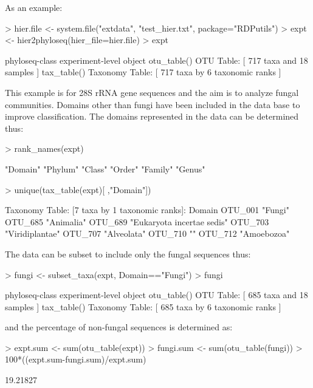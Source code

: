 \documentclass{article}
\begin{document}
As an example:
\begin{Schunk}
\begin{Sinput}
> hier.file <- system.file("extdata", "test_hier.txt", package="RDPutils")
> expt <- hier2phyloseq(hier_file=hier.file)
> expt
\end{Sinput}
\begin{Soutput}
phyloseq-class experiment-level object
otu_table()   OTU Table:         [ 717 taxa and 18 samples ]
tax_table()   Taxonomy Table:    [ 717 taxa by 6 taxonomic ranks ]
\end{Soutput}
\end{Schunk}
This example is for 28S rRNA gene sequences and the aim is to analyze fungal communities.  Domains other than fungi have been included in the data base to improve classification.  The domains represented in the data can be determined thus:
\begin{Schunk}
\begin{Sinput}
> rank_names(expt)
\end{Sinput}
\begin{Soutput}
[1] "Domain" "Phylum" "Class"  "Order"  "Family" "Genus" 
\end{Soutput}
\begin{Sinput}
> unique(tax_table(expt)[ ,"Domain"])
\end{Sinput}
\begin{Soutput}
Taxonomy Table:     [7 taxa by 1 taxonomic ranks]:
        Domain                    
OTU_001 "Fungi"                   
OTU_685 "Animalia"                
OTU_689 "Eukaryota incertae sedis"
OTU_703 "Viridiplantae"           
OTU_707 "Alveolata"               
OTU_710 ""                        
OTU_712 "Amoebozoa"               
\end{Soutput}
\end{Schunk}
The data can be subset to include only the fungal sequences thus:
\begin{Schunk}
\begin{Sinput}
> fungi <- subset_taxa(expt, Domain=="Fungi")
> fungi
\end{Sinput}
\begin{Soutput}
phyloseq-class experiment-level object
otu_table()   OTU Table:         [ 685 taxa and 18 samples ]
tax_table()   Taxonomy Table:    [ 685 taxa by 6 taxonomic ranks ]
\end{Soutput}
\end{Schunk}
and the percentage of non-fungal sequences is determined as:
\begin{Schunk}
\begin{Sinput}
> expt.sum <- sum(otu_table(expt))
> fungi.sum <- sum(otu_table(fungi))
> 100*((expt.sum-fungi.sum)/expt.sum)
\end{Sinput}
\begin{Soutput}
[1] 19.21827
\end{Soutput}
\end{Schunk}
\end{document}
